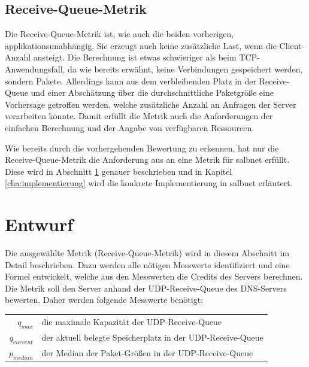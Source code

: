 \documentclass[a4paper, 12pt, BCOR10mm, DIV12, toc=bibliography, toc=listof, german]{scrbook}
\begin{document}

		\subsection*{Receive-Queue-Metrik} %

		Die Receive-Queue-Metrik ist, wie auch die beiden vorherigen, applikationsunabhängig. Sie
		erzeugt auch keine zusätzliche Last, wenn die Client-Anzahl ansteigt. Die Berechnung ist etwas
		schwieriger als beim TCP-Anwendungsfall, da wie bereits erwähnt, keine Verbindungen gespeichert
		werden, sondern Pakete. Allerdings kann aus dem verbleibenden Platz in der Receive-Queue und
		einer Abschätzung über die durchschnittliche Paketgröße eine Vorhersage getroffen werden, welche
		zusätzliche Anzahl an Anfragen der Server verarbeiten könnte. Damit erfüllt die Metrik auch die
		Anforderungen der einfachen Berechnung und der Angabe von verfügbaren Ressourcen.
		

		Wie bereits durch die vorhergehenden Bewertung zu erkennen, hat nur die Receive-Queue-Metrik die
		Anforderung aus \cite{scsczile2008} an eine Metrik für salbnet erfüllt. Diese wird in Abschnitt
		\ref{sec:entwurf} genauer beschrieben und in Kapitel \ref{cha:implementierung} wird die
		konkrete Implementierung in salbnet erläutert.


		\section{Entwurf} %
		\label{sec:entwurf}

		Die ausgewählte Metrik (Receive-Queue-Metrik) wird in diesem Abschnitt im Detail beschrieben.
		Dazu werden alle nötigen Messwerte identifiziert und eine Formel entwickelt, welche aus den
		Messwerten die Credits des Servers berechnen. Die Metrik soll den Server anhand der
		UDP-Receive-Queue des DNS-Servers bewerten. Daher werden folgende Messwerte benötigt: $~$\\
		
		\begin{tabular}{rl}
			$q_{max}$		  & die maximale Kapazität der UDP-Receive-Queue\\
			$q_{current}$ &	der aktuell belegte Speicherplatz in der UDP-Receive-Queue\\
			$p_{median}$  &	der Median der Paket-Größen in der UDP-Receive-Queue\\
		\end{tabular}
		
\end{document}
